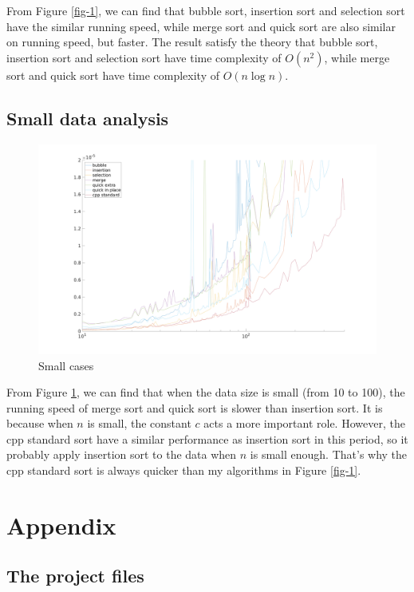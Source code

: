 \documentclass{article}
\begin{document}
From Figure \ref{fig-1}, we can find that bubble sort, insertion sort and selection sort have the similar running speed, while merge sort and quick sort are also similar on running speed, but faster. The result satisfy the theory that bubble sort, insertion sort and selection sort have time complexity of $O(n^2)$, while merge sort and quick sort have time complexity of $O(n\log n)$.

\subsection{Small data analysis}

\begin{figure}[!htbp]
\centering
\includegraphics[width=0.8\linewidth]{../benchmark/fig2.png}
\caption{Small cases}
\label{fig-2}
\end{figure}

From Figure \ref{fig-2}, we can find that when the data size is small (from 10 to 100), the running speed of merge sort and quick sort is slower than insertion sort. It is because when $n$ is small, the constant $c$ acts a more important role. However, the cpp standard sort have a similar performance as insertion sort in this period, so it probably apply insertion sort to the data when $n$ is small enough. That's why the cpp standard sort is always quicker than my algorithms in Figure \ref{fig-1}.

\newpage

\section{Appendix}

\subsection{The project files}
\end{document}
